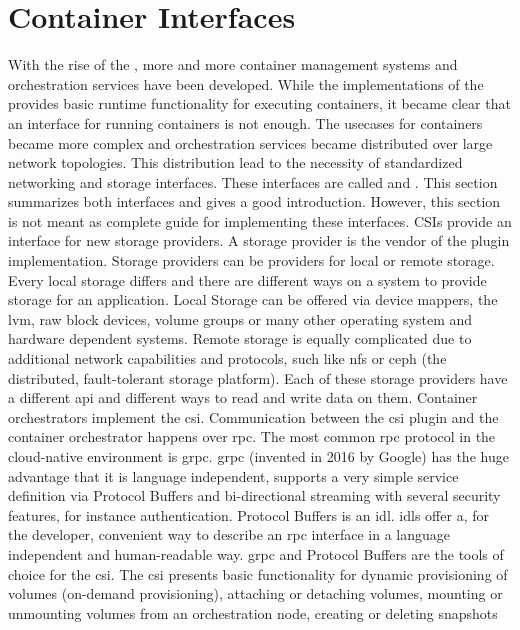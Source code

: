 \documentclass[titlepage]{report}
\begin{document}
\section{Container Interfaces}
With the rise of the , more and more container management systems and orchestration services have been developed.
While the implementations of the  provides basic runtime functionality for executing containers, it became clear that
an interface for running containers is not enough. The usecases for containers became more complex and orchestration services became
distributed over large network topologies. This distribution lead to the necessity of standardized networking and storage interfaces.
These interfaces are called  and . This section summarizes both interfaces and gives a good introduction.
However, this section is not meant as complete guide for implementing these interfaces. CSIs provide an interface for new storage providers.
A storage provider is the vendor of the plugin implementation\cite{CSISpec}. Storage providers can be providers for local or remote storage.
Every local storage differs and there are different ways on a system to provide storage for an application. Local Storage can be offered
via device mappers, the \gls{lvm}, raw block devices, volume groups or many other operating system and hardware dependent systems. Remote
storage is equally complicated due to additional network capabilities and protocols, such like \gls{nfs} or ceph (the distributed, fault-tolerant storage platform).
Each of these storage providers have a different \gls{api} and different ways to read and write data on them.
Container orchestrators implement the \gls{csi}. Communication between the \gls{csi} plugin and the container orchestrator happens over \gls{rpc}. The most common \gls{rpc} protocol
in the cloud-native environment is \gls{grpc}. \gls{grpc} (invented in 2016 by Google) has the huge advantage that it is language independent, supports a very
simple service definition via Protocol Buffers and bi-directional streaming with several security features, for instance authentication\cite{GRPCConcepts}.
Protocol Buffers is an \gls{idl}. \glspl{idl} offer a, for the developer, convenient way to describe an \gls{rpc} interface in a language independent and
human-readable way. \gls{grpc} and Protocol Buffers are the tools of choice for the \gls{csi}. The \gls{csi} presents basic functionality for 
dynamic provisioning of volumes (on-demand provisioning), attaching or detaching volumes, mounting or unmounting volumes from an orchestration node, creating or deleting snapshots
\end{document}

